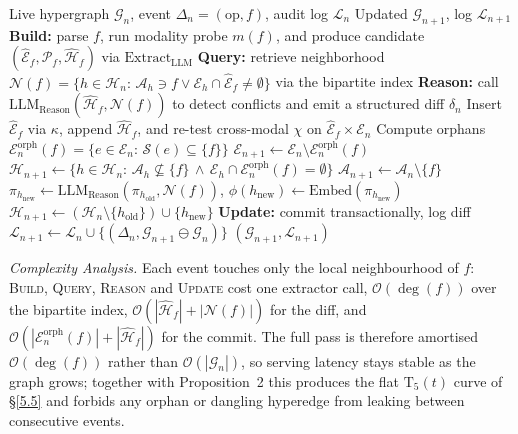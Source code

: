 \documentclass{article}
\begin{document}
\begin{algorithm}[h!t]
\small
\caption{C2 --- Closed-loop Lifecycle Agent (Build--Query--Reason--Update)}
\label{alg:kc-c2}
\begin{algorithmic}[1]
\REQUIRE Live hypergraph $\mathcal{G}_n$, event $\Delta_n\!=\!(\mathrm{op},f)$, audit log $\mathcal{L}_n$
\ENSURE Updated $\mathcal{G}_{n+1}$, log $\mathcal{L}_{n+1}$
\STATE \textbf{Build:} parse $f$, run modality probe $m(f)$, and produce candidate $(\hat{\mathcal{E}}_f,\hat{\mathcal{P}}_f,\hat{\mathcal{H}}_f)$ via $\mathrm{Extract}_{\mathrm{LLM}}$
\STATE \textbf{Query:} retrieve neighborhood $\mathcal{N}(f)\!=\!\{h\!\in\!\mathcal{H}_n\!:\,\mathcal{A}_h\!\ni\!f\!\vee\!\mathcal{E}_h\!\cap\!\hat{\mathcal{E}}_f\!\neq\!\emptyset\}$ via the bipartite index
\STATE \textbf{Reason:} call $\mathrm{LLM}_{\mathrm{Reason}}(\hat{\mathcal{H}}_f,\mathcal{N}(f))$ to detect conflicts and emit a structured diff $\delta_n$
    \STATE Insert $\hat{\mathcal{E}}_f$ via $\kappa$, append $\hat{\mathcal{H}}_f$, and re-test cross-modal $\chi$ on $\hat{\mathcal{E}}_f\!\times\!\mathcal{E}_n$
    \STATE Compute orphans $\mathcal{E}_n^{\mathrm{orph}}(f)\!=\!\{e\!\in\!\mathcal{E}_n\!:\,\mathcal{S}(e)\!\subseteq\!\{f\}\}$ \hfill {}
    \STATE $\mathcal{E}_{n+1}\!\leftarrow\!\mathcal{E}_n\!\setminus\!\mathcal{E}_n^{\mathrm{orph}}(f)$
    \STATE $\mathcal{H}_{n+1}\!\leftarrow\!\{h\!\in\!\mathcal{H}_n\!:\,\mathcal{A}_h\!\not\subseteq\!\{f\}\,\wedge\,\mathcal{E}_h\!\cap\!\mathcal{E}_n^{\mathrm{orph}}(f)\!=\!\emptyset\}$ \hfill {}
    \STATE $\mathcal{A}_{n+1}\!\leftarrow\!\mathcal{A}_n\!\setminus\!\{f\}$
    \STATE $\pi_{h_{\mathrm{new}}}\!\leftarrow\!\mathrm{LLM}_{\mathrm{Reason}}(\pi_{h_{\mathrm{old}}},\mathcal{N}(f))$, $\phi(h_{\mathrm{new}})\!\leftarrow\!\mathrm{Embed}(\pi_{h_{\mathrm{new}}})$
    \STATE $\mathcal{H}_{n+1}\!\leftarrow\!(\mathcal{H}_n\!\setminus\!\{h_{\mathrm{old}}\})\!\cup\!\{h_{\mathrm{new}}\}$
\ENDIF
\STATE \textbf{Update:} commit transactionally, log diff $\mathcal{L}_{n+1}\!\leftarrow\!\mathcal{L}_n\!\cup\!\{(\Delta_n,\mathcal{G}_{n+1}\!\ominus\!\mathcal{G}_n)\}$
\RETURN $(\mathcal{G}_{n+1},\mathcal{L}_{n+1})$
\end{algorithmic}
\end{algorithm}

\textit{Complexity Analysis.} Each event touches only the local neighbourhood of $f$: \textsc{Build}, \textsc{Query}, \textsc{Reason} and \textsc{Update} cost one extractor call, $\mathcal{O}(\deg(f))$ over the bipartite index, $\mathcal{O}(|\hat{\mathcal{H}}_f|\!+\!|\mathcal{N}(f)|)$ for the diff, and $\mathcal{O}(|\mathcal{E}_n^{\mathrm{orph}}(f)|\!+\!|\hat{\mathcal{H}}_f|)$ for the commit. The full pass is therefore amortised $\mathcal{O}(\deg(f))$ rather than $\mathcal{O}(|\mathcal{G}_n|)$, so serving latency stays stable as the graph grows; together with Proposition~2 this produces the flat $\mathrm{T}_5(t)$ curve of \S\ref{5.5} and forbids any orphan or dangling hyperedge from leaking between consecutive events.
\end{document}

